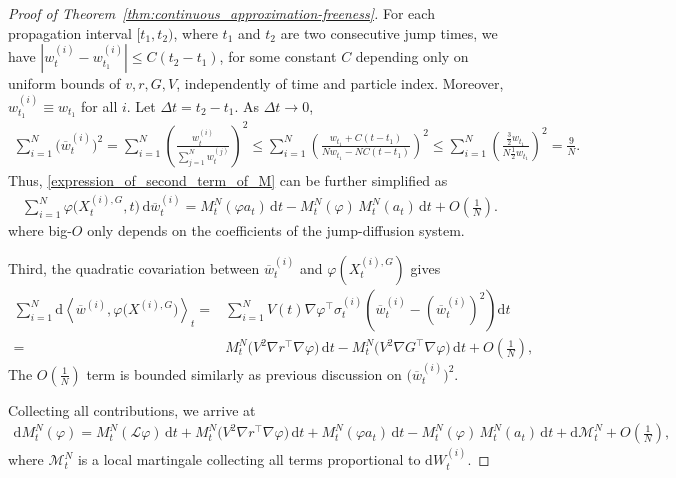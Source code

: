 \documentclass{article}
\theoremstyle{plain}
\theoremstyle{definition}
\theoremstyle{remark}
\newcommand{\dif}{{\mathrm{d}}}
\begin{document}
\begin{proof}[Proof of Theorem~\ref{thm:continuous_approximation-freeness}]
For each propagation interval \([t_1,t_2)\), where \(t_1\) and \(t_2\) are two consecutive jump times, we have \(|w_t^{(i)} - w_{t_1}^{(i)}|\le C (t_2 - t_1)\), for some constant \(C\) depending only on uniform bounds of \(v,r,G,V\), independently of time and particle index. Moreover, \(w_{t_1}^{(i)} \equiv w_{t_1}\) for all \(i\). Let \(\Delta t = t_2 - t_1\). As \(\Delta t \to 0\),
\[
\begin{aligned}
\sum_{i=1}^N \bigl(\overline w_t^{(i)}\bigr)^2
= \sum_{i=1}^N \left(\frac{w_t^{(i)}}{\sum_{j=1}^N w_t^{(j)}}\right)^2 \le \sum_{i=1}^N
\left(
\frac{w_{t_1} + C(t-t_1)}{N w_{t_1} - N C(t-t_1)}
\right)^2 \le \sum_{i=1}^N
\left(
\frac{\frac{3}{2} w_{t_1}}{N \frac{1}{2} w_{t_1}}
\right)^2
= \frac{9}{N}.
\end{aligned}
\]
Thus, \eqref{expression_of_second_term_of_M} can be further simplified as
\begin{align*}
\sum_{i=1}^N \varphi\big(X_t^{(i),G},t\big)\,\dif \overline w_t^{(i)}=
M_t^N(\varphi a_t)\,\dif t-M_t^N(\varphi)\,M_t^N(a_t)\,\dif t + O(\frac{1}{N}).
\end{align*}
where big-\(O\) only depends on the coefficients of the jump-diffusion system.

Third, the quadratic covariation between
\(\overline w_t^{(i)}\) and \(\varphi(X_t^{(i),G})\) gives
\[
\begin{aligned}
\sum_{i=1}^N
\dif\left\langle
\overline w^{(i)},\varphi\big(X^{(i),G}\big)
\right\rangle_t
=& \sum_{i=1}^N V(t)\nabla \varphi^{\top} \sigma_{t}^{(i)} (\overline w_t^{(i)} - (\overline w_t^{(i)})^2) \dif t\\
=& M_t^N\!\big(V^2\nabla r^\top\nabla\varphi\big)\,\dif t-M_t^N\!\big(V^2\nabla G^\top\nabla\varphi\big)\,\dif t + O(\frac{1}{N}),
\end{aligned}
\]
The \(O(\frac{1}{N})\) term is bounded similarly as previous discussion on \(\big(\overline w_t^{(i)}\big)^2\).

Collecting all contributions, we arrive at
\begin{align}
\dif M_t^N(\varphi)
=
M_t^N(\mathcal L\varphi)\,\dif t
+
M_t^N\!\big(V^2\nabla r^\top\nabla\varphi\big)\,\dif t +
M_t^N(\varphi a_t)\,\dif t
-
M_t^N(\varphi)\,M_t^N(a_t)\,\dif t + \dif \mathcal M_t^N + O(\frac{1}{N}),
\label{eq:diffusive_mean}
\end{align}
where \(\mathcal M_t^N\) is a local martingale collecting all terms proportional to \(\dif W_t^{(i)}\).


\end{proof}
\end{document}
